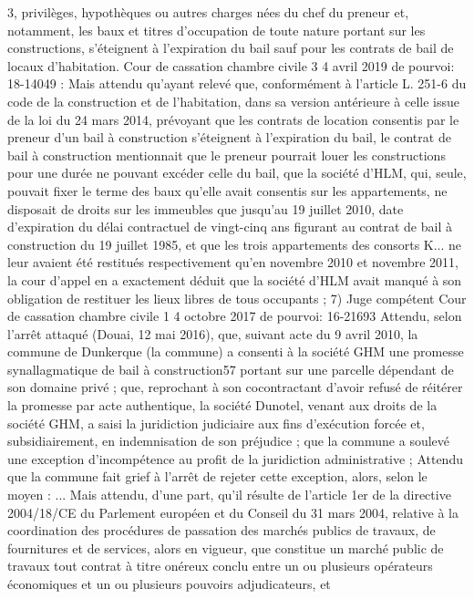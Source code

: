 \documentclass[11pt,a4paper]{report}
\begin{document}
	3, privilèges, hypothèques ou autres charges nées du chef du preneur et, notamment, les baux et titres
	d'occupation de toute nature portant sur les constructions, s'éteignent à l'expiration du bail sauf pour les
	contrats de bail de locaux d'habitation.
	Cour de cassation chambre civile 3 4 avril 2019 \No  de pourvoi: 18-14049 : Mais attendu qu'ayant relevé
	que, conformément à l'article L. 251-6 du code de la construction et de l'habitation, dans sa version antérieure à
	celle issue de la loi du 24 mars 2014, prévoyant que les contrats de location consentis par le preneur d'un bail à
	construction s'éteignent à l'expiration du bail, le contrat de bail à construction mentionnait que le preneur
	pourrait louer les constructions pour une durée ne pouvant excéder celle du bail, que la société d'HLM, qui,
	seule, pouvait fixer le terme des baux qu'elle avait consentis sur les appartements, ne disposait de droits sur les
	immeubles que jusqu'au 19 juillet 2010, date d'expiration du délai contractuel de vingt-cinq ans figurant au
	contrat de bail à construction du 19 juillet 1985, et que les trois appartements des consorts K... ne leur avaient
	été restitués respectivement qu'en novembre 2010 et novembre 2011, la cour d'appel en a exactement déduit que
	la société d'HLM avait manqué à son obligation de restituer les lieux libres de tous occupants ;
	7) Juge compétent
	Cour de cassation chambre civile 1 4 octobre 2017 \No  de pourvoi: 16-21693
	Attendu, selon l'arrêt attaqué (Douai, 12 mai 2016), que, suivant acte du 9 avril 2010, la commune de
	Dunkerque (la commune) a consenti à la société GHM une promesse synallagmatique de bail à construction57
	portant sur une parcelle dépendant de son domaine privé ; que, reprochant à son cocontractant d'avoir refusé de
	réitérer la promesse par acte authentique, la société Dunotel, venant aux droits de la société GHM, a saisi la
	juridiction judiciaire aux fins d'exécution forcée et, subsidiairement, en indemnisation de son préjudice ; que la
	commune a soulevé une exception d'incompétence au profit de la juridiction administrative ;
	Attendu que la commune fait grief à l'arrêt de rejeter cette exception, alors, selon le moyen : ...
	Mais attendu, d'une part, qu'il résulte de l'article 1er de la directive 2004/18/CE du Parlement européen et du
	Conseil du 31 mars 2004, relative à la coordination des procédures de passation des marchés publics de
	travaux, de fournitures et de services, alors en vigueur, que constitue un marché public de travaux tout contrat à
	titre onéreux conclu entre un ou plusieurs opérateurs économiques et un ou plusieurs pouvoirs adjudicateurs, et
\end{document}
